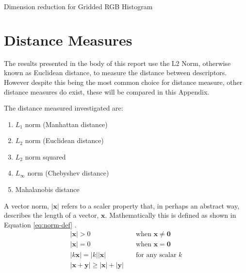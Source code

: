 \begin{appendices}
\begin{table}[ht]
	\caption{ Dimension reduction for Gridded RGB Histogram}
	\label{tbl:pca-dim-red}
	\centering
\end{table}

\chapter{Distance Measures} \label{app:dist-measures}

The results presented in the body of this report use the L2 Norm, otherwise known as Euclidean distance, to measure the distance between descriptors. However despite this being the most common choice for distance measure, other distance measures do exist, these will be compared in this Appendix.

The distance measured investigated are:
\begin{enumerate}
	\item $L_1$ norm (Manhattan distance)
	\item $L_2$ norm (Euclidean distance)
	\item $L_2$ norm squared
	\item $L_\infty $ norm (Chebyshev distance)
	\item Mahalanobis distance
\end{enumerate}

A vector norm, $|\mathbf{x}|$ refers to a scaler property that, in perhaps an abstract way, describes the length of a vector, $\mathbf{x}$. Mathematically this is defined as shown in Equation \ref{eq:norm-def} \cite[p. 1081]{gradshteyn2007}.
\begin{align}
|\mathbf{x}| > 0 \quad &\text{when } \mathbf{x} \neq \mathbf{0} \nonumber \\
|\mathbf{x}| = 0 \quad &\text{when } \mathbf{x} = \mathbf{0} \nonumber \\
|k\mathbf{x}| = |k||\mathbf{x}| \quad &\text{for any scalar } k \nonumber \\
|\mathbf{x}+\mathbf{y}| \geq |\mathbf{x}|+|\mathbf{y}| \quad & \label{eq:norm-def}
\end{align}


\end{appendices}
